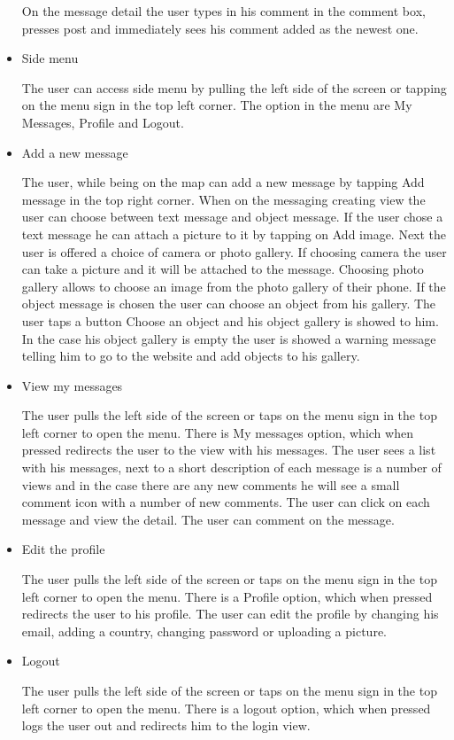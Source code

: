 \documentclass[thesis=M,english]{FITthesis}[2012/10/20]
\begin{document}
\begin{itemize}
	On the message detail the user types in his comment in the comment box, presses post and immediately sees his comment added as the newest one.
		
	\item Side menu
	
	The user can access side menu by pulling the left side of the screen or tapping on the menu sign in the top left corner. The option in the menu are My Messages, Profile and Logout.
	
	\item Add a new message
	
	The user, while being on the map can add a new message by tapping Add message in the top right corner. When on the messaging creating view the user can choose between text message and object message. 
	If the user chose a text message he can attach a picture to it by tapping on Add image. Next the user is offered a choice of camera or photo gallery. If choosing camera the user can take a picture and it will be attached to the message. Choosing photo gallery allows to choose an image from the photo gallery of their phone.
	If the object message is chosen the user can choose an object from his gallery. The user taps a button Choose an object and his object gallery is showed to him. In the case his object gallery is empty the user is showed a warning message telling him to go to the website and add objects to his gallery.
	
	\item View my messages
	
	The user pulls the left side of the screen or taps on the menu sign in the top left corner to open the menu. There is My messages option, which when pressed redirects the user to the view with his messages. The user sees a list with his messages, next to a short description of each message is a number of views and in the case there are any new comments he will see a small comment icon with a number of new comments. The user can click on each message and view the detail. The user can comment on the message.
	
	\item Edit the profile

	The user pulls the left side of the screen or taps on the menu sign in the top left corner to open the menu. There is a Profile option, which when pressed redirects the user to his profile. The user can edit the profile by changing his email, adding a country, changing password or uploading a picture.
	
	\item Logout
	
	The user pulls the left side of the screen or taps on the menu sign in the top left corner to open the menu. There is a logout option, which when pressed logs the user out and redirects him to the login view.

\end{itemize}
\end{document}

